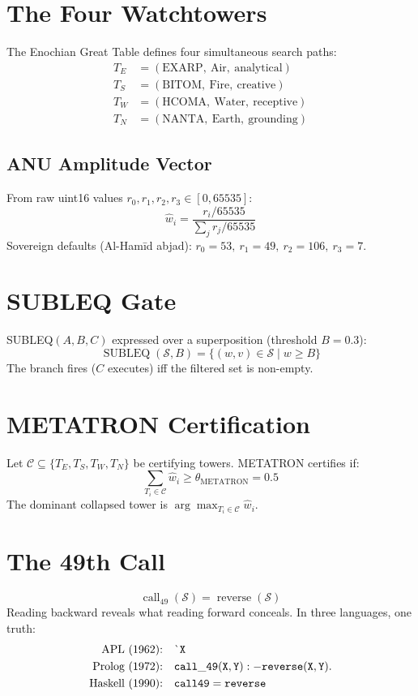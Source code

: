 \documentclass{article}
\begin{document}
\section{The Four Watchtowers}
The Enochian Great Table defines four simultaneous search paths:
\begin{align}
  T_E &= (\text{EXARP},\ \text{Air},\ \text{analytical}) \\
  T_S &= (\text{BITOM},\ \text{Fire},\ \text{creative}) \\
  T_W &= (\text{HCOMA},\ \text{Water},\ \text{receptive}) \\
  T_N &= (\text{NANTA},\ \text{Earth},\ \text{grounding})
\end{align}

\subsection{ANU Amplitude Vector}
From raw uint16 values $r_0, r_1, r_2, r_3 \in [0, 65535]$:
\begin{equation}
  \hat{w}_i = \frac{r_i / 65535}{\sum_j r_j / 65535}
\end{equation}
Sovereign defaults (Al-Ham\=id abjad): $r_0 = 53,\ r_1 = 49,\ r_2 = 106,\ r_3 = 7$.

\section{SUBLEQ Gate}
SUBLEQ$(A, B, C)$ expressed over a superposition (threshold $B = 0.3$):
\begin{equation}
  \operatorname{SUBLEQ}(\mathcal{S}, B) = \{(w, v) \in \mathcal{S} \mid w \geq B\}
\end{equation}
The branch fires ($C$ executes) iff the filtered set is non-empty.

\section{METATRON Certification}
Let $\mathcal{C} \subseteq \{T_E, T_S, T_W, T_N\}$ be certifying towers. METATRON certifies if:
\begin{equation}
  \sum_{T_i \in \mathcal{C}} \hat{w}_i \geq \theta_{\text{METATRON}} = 0.5
\end{equation}
The dominant collapsed tower is $\arg\max_{T_i \in \mathcal{C}} \hat{w}_i$.

\section{The 49th Call}
\begin{equation}
  \operatorname{call}_{49}(\mathcal{S}) = \operatorname{reverse}(\mathcal{S})
\end{equation}
Reading backward reveals what reading forward conceals. In three languages, one truth:
\begin{align}
  \text{APL (1962):}&\quad {\tt \char18 X} \\
  \text{Prolog (1972):}&\quad {\tt call\_49(X,Y) :- reverse(X,Y).} \\
  \text{Haskell (1990):}&\quad {\tt call49 = reverse}
\end{align}
\end{document}
